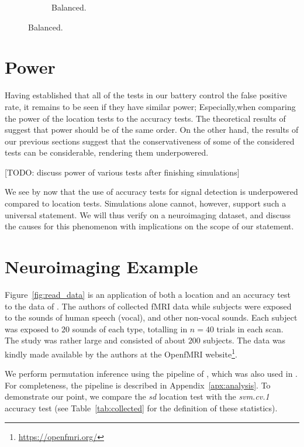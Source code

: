 \documentclass[12pt,a4paper]{article}
\begin{document}
\begin{figure}[h]
\begin{subfigure}{.5\textwidth}
\caption{Balanced.} %
\label{fig:simulation_12}
\end{subfigure}
\end{figure}




\section{Power}
\label{sec:power}

Having established that all of the tests in our battery control the false positive rate, it remains to be seen if they have similar power; 
Especially,when comparing the power of the location tests to the accuracy tests. 
The theoretical results of \cite{ramdas_classification_2016} suggest that power should be of the same order. 
On the other hand, the results of our previous sections suggest that the conservativeness of some of the considered tests can be considerable, rendering them underpowered. 

[TODO: discuss power of various tests after finishing simulations]

We see by now that the use of accuracy tests for signal detection is underpowered compared to location tests. 
Simulations alone cannot, however, support such a universal statement. 
We will thus verify on a neuroimaging dataset, and discuss the causes for this phenomenon with implications on the scope of our statement.



\section{Neuroimaging Example}
\label{sec:example}

Figure~\ref{fig:read_data} is an application of both a location and an accuracy test to the data of \cite{pernet_human_2015}. 
The authors of \cite{pernet_human_2015} collected fMRI data while subjects were exposed to the sounds of human speech (vocal), and other non-vocal sounds. 
Each subject was exposed to $20$ sounds of each type, totalling in $n=40$ trials in each scan.
The study was rather large and consisted of about $200$ subjects.
The data was kindly made available by the authors at the OpenfMRI website\footnote{\url{https://openfmri.org/}}.

We perform permutation inference using the pipeline of \cite{stelzer_statistical_2013}, which was also used in \cite{gilron_quantifying_2016}. 
For completeness, the pipeline is described in Appendix~\ref{apx:analysis}. 
To demonstrate our point, we compare the \emph{sd} location test with the \emph{svm.cv.1} accuracy test (see Table~\ref{tab:collected} for the definition of these statistics). 
\end{document}
